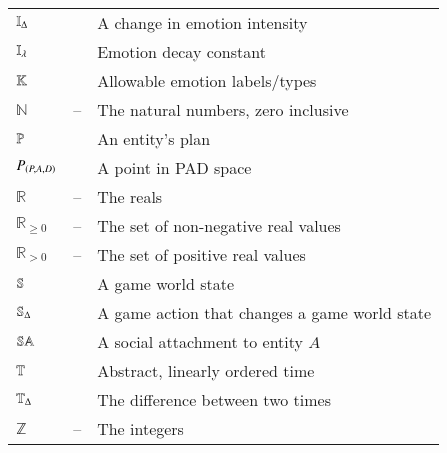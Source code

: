 \begin{center}
\begin{longtable*}{C{0.1\textwidth} C{0.1\textwidth}
            m{0.7\textwidth}}
        $\mathbb{I}_{\Delta}$ &  & A change in emotion
        intensity \\

        $\mathbb{I_{\lambda}}$ &  &
        Emotion decay constant \\

        $\mathbb{K}$ &  & Allowable emotion
        labels/types \\

        $\mathbb{N}$ & -- & The natural numbers, zero
        inclusive \\

        $\mathbb{P}$ &  & An entity's plan \\

        $P_{\left(P,A,D\right)}$ &  & A point in PAD space
        \\

        $\mathbb{R}$ & -- & The reals \\

        $\mathbb{R}_{\geq0}$ & -- & The set of non-negative
        real values \\

        $\mathbb{R}_{>0}$ & -- & The set of positive
        real values \\

        $\mathbb{S}$ &  & A game
        world state \\

        $\mathbb{S}_{\Delta}$ &  & A game action
        that changes a game world state \\

        $\mathbb{SA}$ &  &
        A social attachment to entity $A$ \\

        $\mathbb{T}$ &  & Abstract, linearly ordered time \\

        $\mathbb{T}_{\Delta}$ &  & The difference
        between two times \\

        $\mathbb{Z}$ & -- & The integers \\

        \bottomrule
    \end{longtable*}

\end{center}